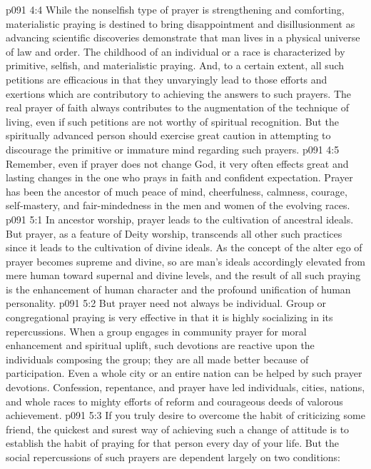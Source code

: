\vs p091 4:4 While the nonselfish type of prayer is strengthening and comforting, materialistic praying is destined to bring disappointment and disillusionment as advancing scientific discoveries demonstrate that man lives in a physical universe of law and order. The childhood of an individual or a race is characterized by primitive, selfish, and materialistic praying. And, to a certain extent, all such petitions are efficacious in that they unvaryingly lead to those efforts and exertions which are contributory to achieving the answers to such prayers. The real prayer of faith always contributes to the augmentation of the technique of living, even if such petitions are not worthy of spiritual recognition. But the spiritually advanced person should exercise great caution in attempting to discourage the primitive or immature mind regarding such prayers.
\pc \vs p091 4:5 Remember, even if prayer does not change God, it very often effects great and lasting changes in the one who prays in faith and confident expectation. Prayer has been the ancestor of much peace of mind, cheerfulness, calmness, courage, self\hyp{}mastery, and fair\hyp{}mindedness in the men and women of the evolving races.
\vs p091 5:1 In ancestor worship, prayer leads to the cultivation of ancestral ideals. But prayer, as a feature of Deity worship, transcends all other such practices since it leads to the cultivation of divine ideals. As the concept of the alter ego of prayer becomes supreme and divine, so are man’s ideals accordingly elevated from mere human toward supernal and divine levels, and the result of all such praying is the enhancement of human character and the profound unification of human personality.
\vs p091 5:2 But prayer need not always be individual. Group or congregational praying is very effective in that it is highly socializing in its repercussions. When a group engages in community prayer for moral enhancement and spiritual uplift, such devotions are reactive upon the individuals composing the group; they are all made better because of participation. Even a whole city or an entire nation can be helped by such prayer devotions. Confession, repentance, and prayer have led individuals, cities, nations, and whole races to mighty efforts of reform and courageous deeds of valorous achievement.
\pc \vs p091 5:3 If you truly desire to overcome the habit of criticizing some friend, the quickest and surest way of achieving such a change of attitude is to establish the habit of praying for that person every day of your life. But the social repercussions of such prayers are dependent largely on two conditions:

